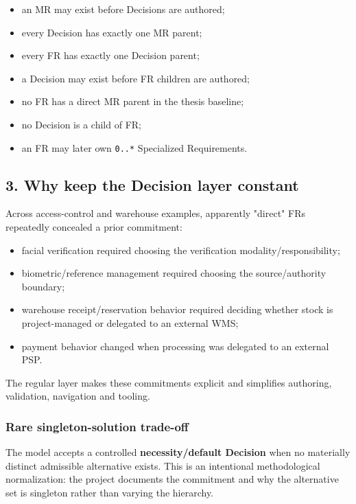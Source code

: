 \documentclass[
  10pt,
]{article}
\providecommand{\tightlist}{%
  \setlength{\itemsep}{0pt}\setlength{\parskip}{0pt}}
\begin{document}
\begin{itemize}
\tightlist
\item
  an MR may exist before Decisions are authored;
\item
  every Decision has exactly one MR parent;
\item
  every FR has exactly one Decision parent;
\item
  a Decision may exist before FR children are authored;
\item
  no FR has a direct MR parent in the thesis baseline;
\item
  no Decision is a child of FR;
\item
  an FR may later own \texttt{0..*} Specialized Requirements.
\end{itemize}

\subsection{3. Why keep the Decision layer
constant}\label{3-why-keep-the-decision-layer-constant}

Across access-control and warehouse examples, apparently "direct" FRs
repeatedly concealed a prior commitment:

\begin{itemize}
\tightlist
\item
  facial verification required choosing the verification
  modality/responsibility;
\item
  biometric/reference management required choosing the source/authority
  boundary;
\item
  warehouse receipt/reservation behavior required deciding whether stock
  is project-managed or delegated to an external WMS;
\item
  payment behavior changed when processing was delegated to an external
  PSP.
\end{itemize}

The regular layer makes these commitments explicit and simplifies
authoring, validation, navigation and tooling.

\subsubsection{Rare singleton-solution
trade-off}\label{rare-singleton-solution-trade-off}

The model accepts a controlled \textbf{necessity/default Decision} when
no materially distinct admissible alternative exists. This is an
intentional methodological normalization: the project documents the
commitment and why the alternative set is singleton rather than varying
the hierarchy.
\end{document}
